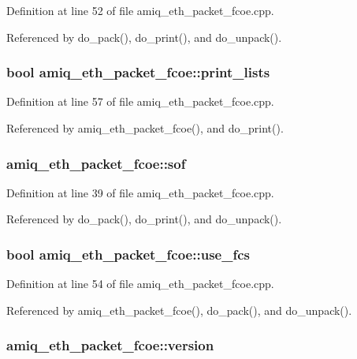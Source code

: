 Definition at line 52 of file amiq\_\-eth\_\-packet\_\-fcoe.cpp.

Referenced by do\_\-pack(), do\_\-print(), and do\_\-unpack().\hypertarget{classamiq__eth__packet__fcoe_a5bf897bdb64335afe41e55c2a879ac5d}{
\subsubsection[{print\_\-lists}]{\setlength{\rightskip}{0pt plus 5cm}bool {\bf amiq\_\-eth\_\-packet\_\-fcoe::print\_\-lists}}}
\label{classamiq__eth__packet__fcoe_a5bf897bdb64335afe41e55c2a879ac5d}


Definition at line 57 of file amiq\_\-eth\_\-packet\_\-fcoe.cpp.

Referenced by amiq\_\-eth\_\-packet\_\-fcoe(), and do\_\-print().\hypertarget{classamiq__eth__packet__fcoe_aa6a32da303dff37582cf2aa1ec127531}{
\subsubsection[{sof}]{ {\bf amiq\_\-eth\_\-packet\_\-fcoe::sof}}}
\label{classamiq__eth__packet__fcoe_aa6a32da303dff37582cf2aa1ec127531}


Definition at line 39 of file amiq\_\-eth\_\-packet\_\-fcoe.cpp.

Referenced by do\_\-pack(), do\_\-print(), and do\_\-unpack().\hypertarget{classamiq__eth__packet__fcoe_aa30ddf7a61b901c161522c827db7fa3e}{
\subsubsection[{use\_\-fcs}]{\setlength{\rightskip}{0pt plus 5cm}bool {\bf amiq\_\-eth\_\-packet\_\-fcoe::use\_\-fcs}}}
\label{classamiq__eth__packet__fcoe_aa30ddf7a61b901c161522c827db7fa3e}


Definition at line 54 of file amiq\_\-eth\_\-packet\_\-fcoe.cpp.

Referenced by amiq\_\-eth\_\-packet\_\-fcoe(), do\_\-pack(), and do\_\-unpack().\hypertarget{classamiq__eth__packet__fcoe_ad8ebe22dab7fcf728dbcb1353aead75a}{
\subsubsection[{version}]{ {\bf amiq\_\-eth\_\-packet\_\-fcoe::version}}}
\label{classamiq__eth__packet__fcoe_ad8ebe22dab7fcf728dbcb1353aead75a}


